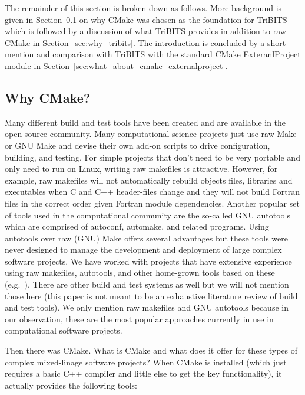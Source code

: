 \documentclass[note]{TechNote}
\begin{document}
The remainder of this section is broken down as follows.  More background is given in Section~\ref{sec:why_cmake} on why CMake was chosen as the foundation for TriBITS which is followed by a discussion of what TriBITS provides in addition to raw CMake in Section~\ref{sec:why_tribits}.  The introduction is concluded by a short mention and comparison with TriBITS with the standard CMake ExteranlProject module in Section~\ref{sec:what_about_cmake_externalproject}.

%
\subsection{Why CMake?}
\label{sec:why_cmake}
%

Many different build and test tools have been created and are available in the open-source community.  Many computational science projects just use raw Make or GNU Make and devise their own add-on scripts to drive configuration, building, and testing.  For simple projects that don't need to be very portable and only need to run on Linux, writing raw makefiles is attractive.  However, for example, raw makefiles will not automatically rebuild objects files, libraries and executables when C and C++ header-files change and they will not build Fortran files in the correct order given Fortran module dependencies.  Another popular set of tools used in the computational community are the so-called GNU autotools which are comprised of autoconf, automake, and related programs.  Using autotools over raw (GNU) Make offers several advantages but these tools were never designed to manage the development and deployment of large complex software projects.  We have worked with projects that have extensive experience using raw makefiles, autotools, and other home-grown tools based on these (e.g.\ \cite{Trilinos}).  There are other build and test systems as well but we will not mention those here (this paper is not meant to be an exhaustive literature review of build and test tools).  We only mention raw makefiles and GNU autotools because in our observation, these are the most popular approaches currently in use in computational software projects.

Then there was CMake.  What is CMake and what does it offer for these types of complex mixed-linage software projects?  When CMake is installed (which just requires a basic C++ compiler and little else to get the key functionality), it actually provides the following tools:
\end{document}

